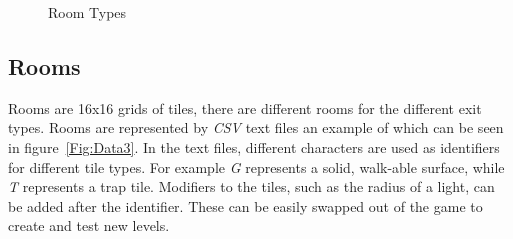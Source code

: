 \documentclass[11pt]{article}
\begin{document}
\begin{figure}[!htb]
\begin {minipage}{0.49\textwidth}
     \caption{Room Types}\label{Fig:Data2}
   \end{minipage}
\end{figure}

\subsection{Rooms}
Rooms are 16x16 grids of tiles, there are different rooms for the different exit types. Rooms are represented by \textit{CSV} text files an example of which can be seen in figure~\ref{Fig:Data3}. In the text files, different characters are used as identifiers for different tile types. For example \textit{G} represents a solid, walk-able surface, while \textit{T} represents a trap tile. Modifiers to the tiles, such as the radius of a light, can be added after the identifier. These can be easily swapped out of the game to create and test new levels.\\
\end{document}
